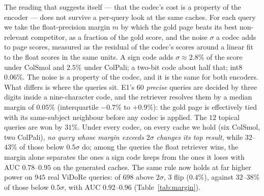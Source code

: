 \documentclass[conference]{IEEEtran}
\begin{document}
The reading that suggests itself --- that the codec's cost is a property of the
encoder --- does not survive a per-query look at the same caches. For each query
we take the float-precision margin $m$ by which the gold page beats its best
non-relevant competitor, as a fraction of the gold score, and the noise $\sigma$
a codec adds to page scores, measured as the residual of the codec's scores
around a linear fit to the float scores in the same units. A sign code adds
$\sigma \approx 2.8\%$ of the score under ColSmol and $2.5\%$ under ColPali; a
two-bit code about half that; int8 $0.06\%$. The noise is a property of the
codec, and it is the same for both encoders. What differs is where the queries
sit. E1's $60$ \emph{precise} queries are decided by three digits inside a
nine-character code, and the retriever resolves them by a median margin of
$0.05\%$ (interquartile $-0.7\%$ to $+0.9\%$): the gold page is effectively tied
with its same-subject neighbour before any codec is applied. The $12$ topical
queries are won by $31\%$. Under every codec, on every cache we hold (six
ColSmol, two ColPali), \emph{no query whose margin exceeds $2\sigma$ changes its
top result}, while $32$--$43\%$ of those below $0.5\sigma$ do; among the queries
the float retriever wins, the margin alone separates the ones a sign code keeps
from the ones it loses with AUC $0.78$--$0.95$ on the generated caches. The same
rule now holds at far higher power on $945$ real ViDoRe queries: of $698$ above
$2\sigma$, $3$ flip ($0.4\%$), against $32$--$38\%$ of those below $0.5\sigma$,
with AUC $0.92$--$0.96$ (Table~\ref{tab:margin}).
\end{document}
